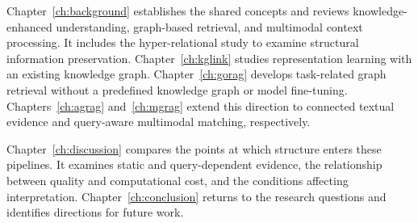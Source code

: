Chapter~\ref{ch:background} establishes the shared concepts and reviews knowledge-enhanced understanding, graph-based retrieval, and multimodal context processing. It includes the hyper-relational study to examine structural information preservation. Chapter~\ref{ch:kglink} studies representation learning with an existing knowledge graph. Chapter~\ref{ch:gorag} develops task-related graph retrieval without a predefined knowledge graph or model fine-tuning. Chapters~\ref{ch:agrag} and~\ref{ch:mgrag} extend this direction to connected textual evidence and query-aware multimodal matching, respectively.

Chapter~\ref{ch:discussion} compares the points at which structure enters these pipelines. It examines static and query-dependent evidence, the relationship between quality and computational cost, and the conditions affecting interpretation. Chapter~\ref{ch:conclusion} returns to the research questions and identifies directions for future work.
